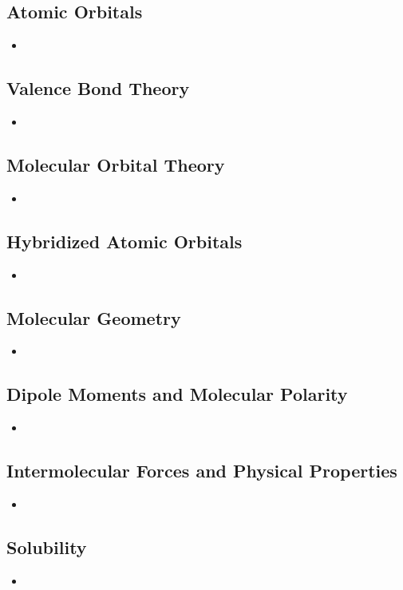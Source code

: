 \documentclass[12pt,a4paper]{article}
\begin{document}
\subsection{Atomic Orbitals}
\begin{itemize}
    \item 
\end{itemize}

\subsection{Valence Bond Theory}
\begin{itemize}
    \item 
\end{itemize}

\subsection{Molecular Orbital Theory}
\begin{itemize}
    \item 
\end{itemize}

\subsection{Hybridized Atomic Orbitals}
\begin{itemize}
    \item 
\end{itemize}

\subsection{Molecular Geometry}
\begin{itemize}
    \item 
\end{itemize}

\subsection{Dipole Moments and Molecular Polarity}
\begin{itemize}
    \item 
\end{itemize}

\subsection{Intermolecular Forces and Physical Properties}
\begin{itemize}
    \item 
\end{itemize}

\subsection{Solubility}
\begin{itemize}
    \item 
\end{itemize}
\end{document}
